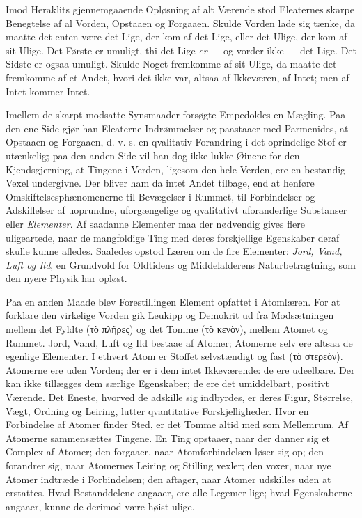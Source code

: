 \documentclass[12pt,a4paper]{book}
\begin{document}
Imod Heraklits gjennemgaaende Opløsning af alt Værende stod Eleaternes skarpe
Benegtelse af al Vorden, Opstaaen og Forgaaen. Skulde Vorden lade sig tænke,
da maatte det enten være det Lige, der kom af det Lige, eller det Ulige, der
kom af sit Ulige. Det Første er umuligt, thi det Lige \emph{er} --- og vorder
ikke --- det Lige. Det Sidste er ogsaa umuligt. Skulde Noget fremkomme af sit
Ulige, da maatte det fremkomme af et Andet, hvori det ikke var, altsaa af
Ikkeværen, af Intet; men af Intet kommer Intet.

Imellem de skarpt modsatte Synsmaader forsøgte Empedokles en Mægling. Paa den
ene Side gjør han Eleaterne Indrømmelser og paastaaer med Parmenides, at
Opstaaen og Forgaaen, d. v. s. en qvalitativ Forandring i det oprindelige Stof
er utænkelig; paa den anden Side vil han dog ikke lukke Øinene for den
Kjendsgjerning, at Tingene i Verden, ligesom den hele Verden, ere en bestandig
Vexel undergivne. Der bliver ham da intet Andet tilbage, end at henføre
Omskiftelsesphænomenerne til Bevægelser i Rummet, til Forbindelser og
Adskillelser af uoprundne, uforgængelige og qvalitativt uforanderlige
Substanser eller \emph{Elementer}. Af saadanne Elementer maa der nødvendig
gives flere uligeartede, naar de mangfoldige Ting med deres forskjellige
Egenskaber deraf skulle kunne afledes. Saaledes opstod Læren om de fire
Elementer: \emph{Jord, Vand, Luft og Ild}, en Grundvold for Oldtidens og
Middelalderens Naturbetragtning, som den nyere Physik har opløst.

Paa en anden Maade blev Forestillingen Element opfattet i Atomlæren. For at
forklare den virkelige Vorden gik Leukipp og Demokrit ud fra Modsætningen
mellem det Fyldte (τὸ πλῆρες) og det Tomme (τὸ κενὸν), mellem
Atomet og Rummet. Jord, Vand, Luft og Ild bestaae af Atomer; Atomerne selv ere
altsaa de egenlige Elementer. I ethvert Atom er Stoffet selvstændigt og fast
(τὸ στερεὸν). Atomerne ere uden Vorden; der er i dem intet Ikkeværende: de ere
udeelbare. Der kan ikke tillægges dem særlige Egenskaber; de ere det
umiddelbart, positivt Værende. Det Eneste, hvorved de adskille sig indbyrdes,
er deres Figur, Størrelse, Vægt, Ordning og Leiring, lutter qvantitative
Forskjelligheder. Hvor en Forbindelse af Atomer finder Sted, er det Tomme
altid med som Mellemrum. Af Atomerne sammensættes Tingene. En Ting opstaaer,
naar der danner sig et Complex af Atomer; den forgaaer, naar Atomforbindelsen
løser sig op; den forandrer sig, naar Atomernes Leiring og Stilling vexler;
den voxer, naar nye Atomer indtræde i Forbindelsen; den aftager, naar Atomer
udskilles uden at erstattes. Hvad Bestanddelene angaaer, ere alle Legemer
lige; hvad Egenskaberne angaaer, kunne de derimod være høist ulige.
\end{document}
